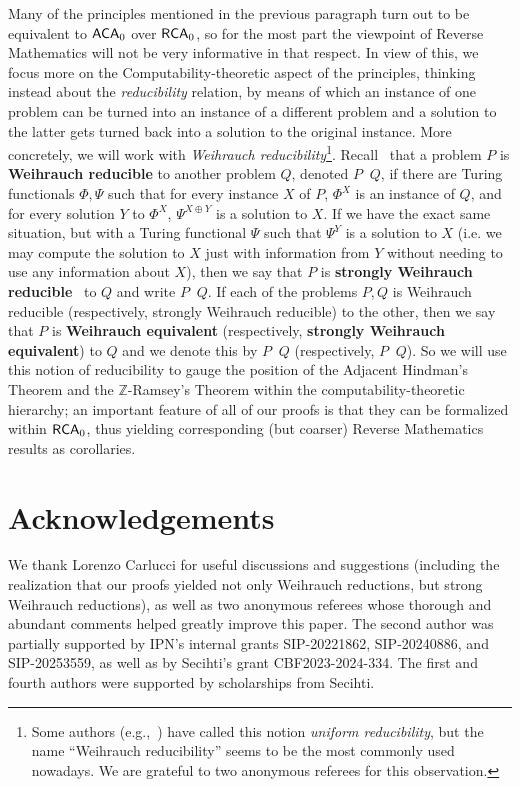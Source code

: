 \documentclass[11pt]{amsart}
\newcommand{\rca}{\mathnormal{\mathsf{RCA}}_0}
\newcommand{\aca}{\mathnormal{\mathsf{ACA}}_0}
\newcommand{\weileq}{\mathop{\leq_{\mathsf{W}}}}
\newcommand{\weisleq}{\mathop{\leq_{\mathrm{s}\mathsf{W}}}}
\newcommand{\weieq}{\mathop{\equiv_{\mathsf{W}}}}
\newcommand{\weiseq}{\mathop{\equiv_{\mathrm{s}\mathsf{W}}}}
\theoremstyle{definition}
\begin{document}
Many of the principles mentioned in the previous paragraph turn out to be equivalent to $\aca$ over $\rca$, so for the most part the viewpoint of Reverse Mathematics will not be very informative in that respect. In view of this, we focus more on the Computability-theoretic aspect of the principles, thinking instead about the {\it reducibility} relation, by means of which an instance of one problem can be turned into an instance of a different problem and a solution to the latter gets turned back into a solution to the original instance. More concretely, we will work with {\it Weihrauch reducibility}\footnote{Some authors (e.g.,~\cite[p. 22]{hirschfeldt}) have called this notion {\it uniform reducibility}, but the name ``Weihrauch reducibility'' seems to be the most commonly used nowadays. We are grateful to two anonymous referees for this observation.}. Recall~\cite[Definition 4.3.1]{dzhafarov-mummert-textbook} that a problem $P$ is {\bf Weihrauch reducible} to another problem $Q$, denoted $P\weileq Q$, if there are Turing functionals $\Phi,\Psi$ such that for every instance $X$ of $P$, $\Phi^X$ is an instance of $Q$, and for every solution $Y$ to $\Phi^X$, $\Psi^{X\oplus Y}$ is a solution to $X$. If we have the exact same situation, but with a Turing functional $\Psi$ such that $\Psi^Y$ is a solution to $X$ (i.e. we may compute the solution to $X$ just with information from $Y$ without needing to use any information about $X$), then we say that $P$ is {\bf strongly Weihrauch reducible}~\cite[Definition 4.4.1]{dzhafarov-mummert-textbook} to $Q$ and write $P\weisleq Q$. If each of the problems $P,Q$ is Weihrauch reducible (respectively, strongly Weihrauch reducible) to the other, then we say that $P$ is {\bf Weihrauch equivalent} (respectively, {\bf strongly Weihrauch equivalent}) to $Q$ and we denote this by $P\weieq Q$ (respectively, $P\weiseq Q$). So we will use this notion of reducibility to gauge the position of the Adjacent Hindman's Theorem and the $\mathbb Z$-Ramsey's Theorem within the computability-theoretic hierarchy; an important feature of all of our proofs is that they can be formalized within $\rca$, thus yielding corresponding (but coarser) Reverse Mathematics results as corollaries.

\section*{Acknowledgements}

We thank Lorenzo Carlucci for useful discussions and suggestions (including the realization that our proofs yielded not only Weihrauch reductions, but strong Weihrauch reductions), as well as two anonymous referees whose thorough and abundant comments helped greatly improve this paper. The second author was partially supported by IPN's internal grants SIP-20221862, SIP-20240886, and SIP-20253559, as well as by Secihti's grant CBF2023-2024-334. The first and fourth authors were supported by scholarships from Secihti.
\end{document}
